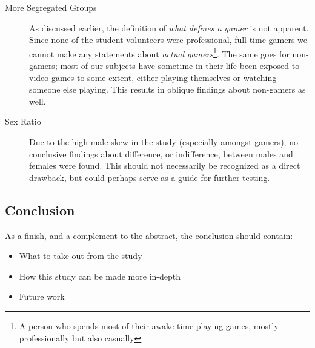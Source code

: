 \documentclass[runningheads,a4paper,oribibl]{llncs}
\begin{document}
\begin{description}
	\item[More Segregated Groups] As discussed earlier, the definition of \emph{what defines a gamer} is not apparent. Since none of the student volunteers were professional, full-time gamers we cannot make any statements about \emph{actual gamers}\footnote{A person who spends most of their awake time playing games, mostly professionally but also casually}. The same goes for non-gamers; most of our subjects have sometime in their life been exposed to video games to some extent, either playing themselves or watching someone else playing. This results in oblique findings about non-gamers as well.

	\item[Sex Ratio] Due to the high male skew in the study (especially amongst gamers), no conclusive findings about difference, or indifference, between males and females were found. This should not necessarily be recognized as a direct drawback, but could perhaps serve as a guide for further testing.
\end{description}




\subsection{Conclusion}
As a finish, and a complement to the abstract, the conclusion should contain:
\begin{itemize}
	\item What to take out from the study
	\item How this study can be made more in-depth
	\item Future work
\end{itemize}











\end{document}

